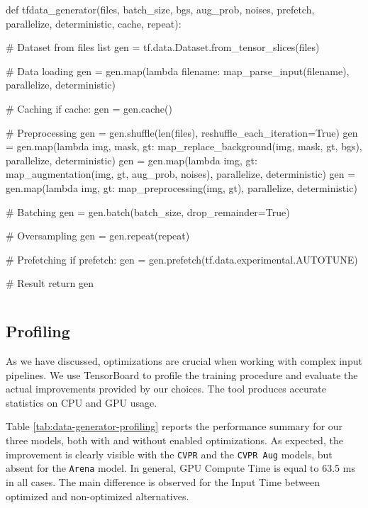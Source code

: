 \vspace{0.2cm}
\begin{python}
def tfdata_generator(files, batch_size, 
                     bgs, aug_prob, noises,
                     prefetch, parallelize, deterministic,
                     cache, repeat):

    # Dataset from files list
    gen = tf.data.Dataset.from_tensor_slices(files)
    
    # Data loading
    gen = gen.map(lambda filename: 
                    map_parse_input(filename),
                    parallelize, deterministic)

    # Caching
    if cache:
        gen = gen.cache()
    
    # Preprocessing
    gen = gen.shuffle(len(files), reshuffle_each_iteration=True)
    gen = gen.map(lambda img, mask, gt: 
                    map_replace_background(img, mask, gt, bgs),
                    parallelize, deterministic)
    gen = gen.map(lambda img, gt: 
                    map_augmentation(img, gt, aug_prob, noises), 
                    parallelize, deterministic)
    gen = gen.map(lambda img, gt: 
                    map_preprocessing(img, gt), 
                    parallelize, deterministic)

    # Batching
    gen = gen.batch(batch_size, drop_remainder=True)
    
    # Oversampling
    gen = gen.repeat(repeat)

    # Prefetching
    if prefetch:
        gen = gen.prefetch(tf.data.experimental.AUTOTUNE)

    # Result
    return gen
\end{python}
\vspace{-0.5cm}
\begin{lstlisting}[frame=none,caption={Chosen \texttt{tf.data} input pipeline}, 
label=lst:tfdata_generator]
\end{lstlisting}


\subsection{Profiling}

As we have discussed, optimizations are crucial when working with complex input pipelines. We use TensorBoard \cite{tensorboard} to profile the training procedure and evaluate the actual improvements provided by our choices. The tool produces accurate statistics on CPU and GPU usage.

Table \ref{tab:data-generator-profiling} reports the performance summary for our three models, both with and without enabled optimizations. As expected, the improvement is clearly visible with the \texttt{CVPR} and the \texttt{CVPR Aug} models, but absent for the \texttt{Arena} model. In general, GPU Compute Time is equal to 63.5 ms in all cases. The main difference is observed for the Input Time between optimized and non-optimized alternatives.

